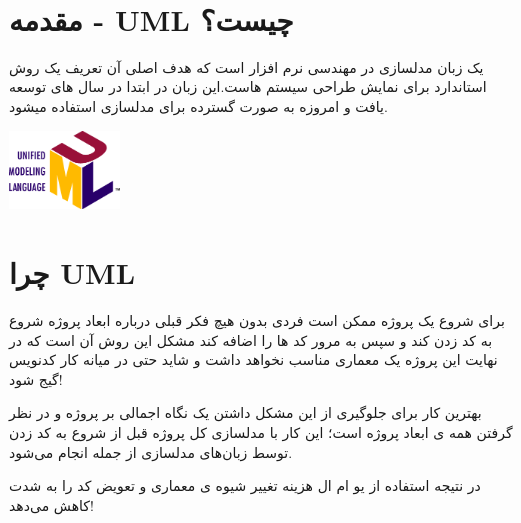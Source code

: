\documentclass[]{article}
\begin{document}
\newpage
\pagestyle{fancy}
\fancyhf{}
\fancyfoot{}
\cfoot{\thepage}
\renewcommand{\headrulewidth}{2pt}

\KashidaOff


 \Large \textbf{\\
}


\section*{{\titr مقدمه - UML چیست؟}}

 یک زبان مدلسازی در مهندسی نرم افزار است که هدف اصلی آن تعریف یک روش استاندارد برای نمایش طراحی سیستم هاست.این زبان در ابتدا در سال های   توسعه یافت و امروزه به صورت گسترده برای مدلسازی استفاده میشود.

\begin{center}

\includegraphics[width=0.22\textwidth]{images/image4.png}

\end{center}



\section*{{\titr چرا UML}}

برای شروع یک پروژه ممکن است فردی بدون هیچ فکر قبلی درباره ابعاد پروژه شروع به کد زدن کند و سپس به مرور کد ها را اضافه کند مشکل این روش آن است که در نهایت این پروژه یک معماری مناسب نخواهد داشت و شاید حتی در میانه کار کدنویس گیج شود!

 بهترین کار برای جلوگیری از این مشکل داشتن یک نگاه اجمالی بر پروژه  و در نظر گرفتن همه ی ابعاد پروژه است؛ این کار با مدلسازی کل پروژه قبل از شروع به کد زدن توسط زبان‌های مدلسازی از جمله  انجام می‌شود.
 
در نتیجه استفاده از یو ام ال هزینه تغییر شیوه ی معماری و تعویض کد را به شدت کاهش می‌دهد!
\end{document}
